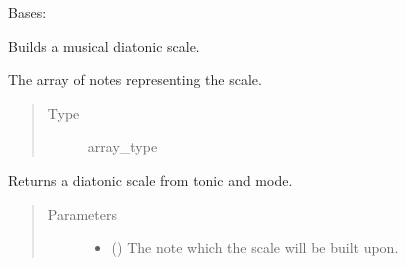 \documentclass[letterpaper,10pt,english]{sphinxmanual}
\begin{document}

\begin{fulllineitems}
\label{\detokenize{index:birdears.scale.DiatonicScale}}
Bases: {\hyperref[\detokenize{index:birdears.scale.ScaleBase}]{}}

Builds a musical diatonic scale.

\begin{fulllineitems}
\label{\detokenize{index:birdears.scale.DiatonicScale.scale}}
The array of notes representing the scale.
\begin{quote}\begin{description}
\item[{Type}] \leavevmode
array\_type

\end{description}\end{quote}

\end{fulllineitems}


\begin{fulllineitems}
\label{\detokenize{index:birdears.scale.DiatonicScale.__init__}}
Returns a diatonic scale from tonic and mode.
\begin{quote}\begin{description}
\item[{Parameters}] \leavevmode\begin{itemize}
\item {} 
 () \textendash{} The note which the scale will be built upon.


\end{itemize}
\end{description}
\end{quote}
\end{fulllineitems}
\end{fulllineitems}
\end{document}
